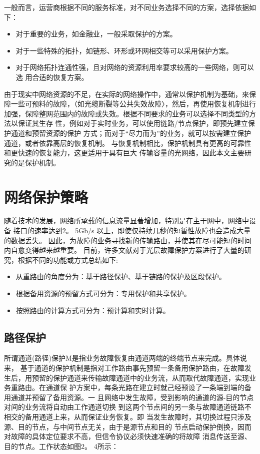 一般而言，运营商根据不同的服务标准，对不同业务选择不同的方案，选择依据如下：
\begin{itemize}
  \item 对于重要的业务，如金融业，一般采取保护的方案。
  \item 对于一些特殊的拓扑，如链形、环形或环网相交等可以采用保护方案。
  \item 对于网络拓扑连通性强，且对网络的资源利用率要求较高的一些网络，则可以选
用合适的恢复方案。
\end{itemize}

由于现实中网络资源的不足，在实际的网络操作中，通常以保护机制为基础，來保 障一些可预料的故障，（如光缆断裂等公共失效故障〉，然后，再使用恢复机制进行加强，保障整网范围内的故障或失效。根据不同要求的业务可以选择不同类型的方法以保证其生存 性，例如对于实时业务，可以使用链路/节点保护，即预先建立保护通道和预留资源的保护 方式；而对于“尽力而为”的业务，就可以按需建立保护通道，或者依靠高层的恢复机制。 与恢复机制相比，保护机制具有更高的可靠性和更快速的恢复能力，这更适用于具有巨大 传输容量的光网络，因此本文主要研究的是保护机制。
\section{网络保护策略}
随着技术的发展，网络所承载的信息流量显著增加，特别是在主干网中，网络中设备 接口的速率达到2。 5Gb/s 以上，即使仅持续几秒的短暂性故障也会造成大量的数据丢失。 因此，为故障的业务寻找新的传输路由，并使其在尽可能短的时间内自愈变得越来越重要。 目前，许多文献对于光层故障保护方案进行了大量的研究，根据不同的功能或方式总结如下:
\begin{itemize}
  \item 从重路由的角度分为：基于路径保护、基于链路的保护及区段保护。
  \item 根据备用资源的预留方式可分为：专用保护和共享保护。
  \item 按照路由的计算方式可分为：预计算和实时计算。
\end{itemize}
\subsection{路径保护}
所谓通道(路径)保护M是指业务故障恢复由通道两端的终端节点来完成。具体说来， 基于通道的保护机制是指对工作路由事先预留一条备用保护路由，在故障发生后，用预留的保护通道来传输故障通道中的业务流，从而取代故障通道，实现业务重路由。在通道保 护方案中，每条光路在建立时就己经预设了一条端到端的备用通道并预留了备用资源。一 且网络中发生故障，受到影响的通道的源-目的节点对间的业务流将自动由工作通道切换 到这两个节点间的另一条与故障通道链路不相交的备用通道上来，从而保证业务恢复。即 当发生故障时，其切换过程只涉及源、目的节点，与中间节点无关，由于是源节点和目的 节点启动保护倒换，因而对故障的具体定位要求不高，但信令协议必须快速准确的将故障 消息传送至源、目的节点。工作状态如图2。 4所示：

